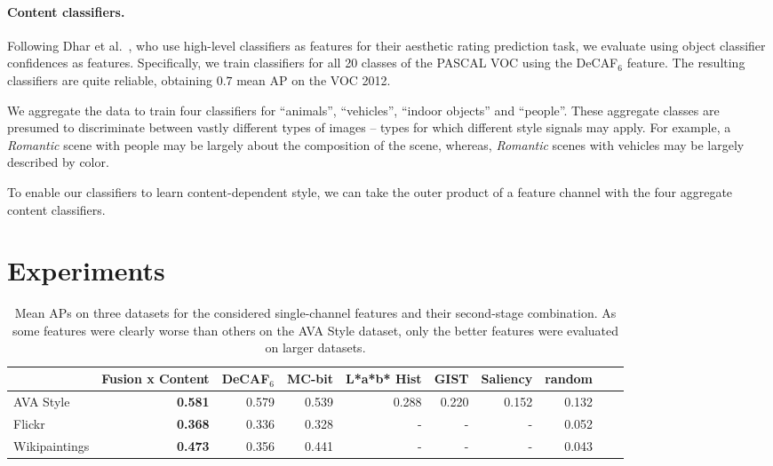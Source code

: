 \paragraph{Content classifiers.}
Following Dhar et al.~\parencite{Dhar-CVPR-2011}, who use high-level classifiers as features for their aesthetic rating prediction task, we evaluate using object classifier confidences as features.
Specifically, we train classifiers for all 20 classes of the PASCAL VOC \parencite{pascal-voc-2010} using the DeCAF$_6$ feature.
The resulting classifiers are quite reliable, obtaining $0.7$ mean AP on the VOC 2012.

We aggregate the data to train four classifiers for ``animals'', ``vehicles'', ``indoor objects'' and ``people''.
These aggregate classes are presumed to discriminate between vastly different types of images -- types for which different style signals may apply.
For example, a \emph{Romantic} scene with people may be largely about the composition of the scene, whereas, \emph{Romantic} scenes with vehicles may be largely described by color.

To enable our classifiers to learn content-dependent style, we can take the outer product of a feature channel with the four aggregate content classifiers.

\section{Experiments}

\begin{table}
\caption[Mean APs on AVA Style, Flickr Style, and Wikipaintings for single-channel features and their second-stage combinations.]{
    Mean APs on three datasets for the considered single-channel features and their second-stage combination.
    As some features were clearly worse than others on the AVA Style dataset, only the better features were evaluated on larger datasets.
}
\label{tab:mean_aps}
\centering
\vspace{1em}
\footnotesize{
\begin{tabular}{lrrrrrrrrr}
\toprule
{}                & Fusion x Content & DeCAF$_6$ & MC-bit & L*a*b* Hist & GIST  & Saliency & random \\
\midrule
AVA Style         & \textbf{0.581}   & 0.579     & 0.539  & 0.288       & 0.220 & 0.152    & 0.132 \\
Flickr            & \textbf{0.368}   & 0.336     & 0.328  & -           & -     & -        & 0.052 \\
Wikipaintings     & \textbf{0.473}   & 0.356     & 0.441  & -           & -     & -        & 0.043 \\
\bottomrule
\end{tabular}
}
\end{table}

